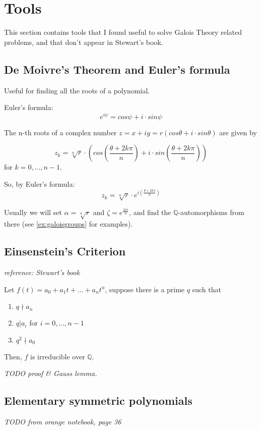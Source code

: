 \documentclass{article}
\theoremstyle{definition}
\begin{document}
\newpage

\section{Tools}
This section contains tools that I found useful to solve Galois Theory related problems, and that don't appear in Stewart's book.

\subsection{De Moivre's Theorem and Euler's formula}\label{demoivre}
Useful for finding all the roots of a polynomial.

Euler's formula:
$$e^{i \psi} = cos \psi + i \cdot sin \psi$$

The n-th roots of a complex number $z=x + i y = r (cos \theta + i \cdot sin \theta)$ are given by

$$z_k = \sqrt[n]{r} \cdot \left(cos(\frac{\theta + 2k \pi}{n}) + i \cdot sin(\frac{\theta + 2k \pi}{n}) \right)$$
for $k=0, \ldots, n-1$.

So, by Euler's formula:
$$z_k = \sqrt[n]{r} \cdot e^{i (\frac{\theta + 2 k \pi}{n})}$$

Usually we will set $\alpha=\sqrt[n]{r}$ and $\zeta = e^{\frac{2 \pi i}{n}}$,
and find the $\mathbb{Q}$-automorphisms from there (see \ref{ex:galoisgroups} for examples).

\subsection{Einsenstein's Criterion} \label{einsenstein}
\emph{reference: Stewart's book}

Let $f(t) = a_0 + a_1 t + \ldots + a_n t^n$, suppose there is a prime $q$ such that
\begin{enumerate}
  \item $q \nmid a_n$
  \item $q | a_i$ for $i=0, \ldots, n-1$
  \item $q^2 \nmid a_0$
\end{enumerate}
Then, $f$ is irreducible over $\mathbb{Q}$.

\emph{TODO proof \& Gauss lemma.}


\subsection{Elementary symmetric polynomials}
\emph{TODO from orange notebook, page 36}
\end{document}

